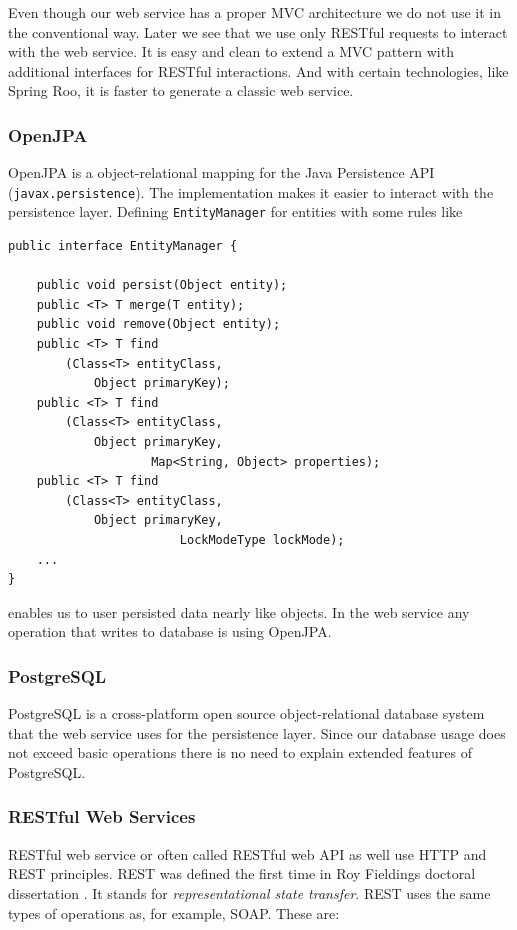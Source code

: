Even though our web service has a proper MVC architecture we do
 not
 use it in the conventional way. Later we see that we use only RESTful requests to interact with the web service. It is easy and clean to extend a MVC pattern with additional interfaces for RESTful interactions. And with certain technologies, like Spring Roo, it is faster to generate a classic web service.

\subsubsection*{OpenJPA}
OpenJPA is a object-relational mapping for the Java Persistence API (\sloppy \verb^javax.persistence^). The implementation makes it easier to interact with the persistence layer. Defining \verb^EntityManager^ for entities with some rules like

\begin{lstlisting}
public interface EntityManager {

    public void persist(Object entity);
    public <T> T merge(T entity);
    public void remove(Object entity);
    public <T> T find
		(Class<T> entityClass, 
			Object primaryKey);
    public <T> T find
		(Class<T> entityClass, 
			Object primaryKey, 
                	Map<String, Object> properties); 
    public <T> T find
		(Class<T> entityClass, 
			Object primaryKey,
                      	LockModeType lockMode);
	...
}
\end{lstlisting}
enables us to user persisted data nearly like objects. 
In the web service any operation that writes to database is using OpenJPA.

\subsubsection*{PostgreSQL}
PostgreSQL is a cross-platform open source object-relational database system that the web service uses for the persistence layer. Since our database usage does
 not
 exceed basic operations there is no need to explain extended features of PostgreSQL.

\subsubsection*{RESTful Web Services}
RESTful web service or often called RESTful web API as well use HTTP and REST principles. REST was defined the first time in Roy Fieldings doctoral dissertation \cite{fielding2000architectural}. It stands for \emph{representational state transfer}. REST uses the same types of operations as, for example, SOAP. These are:

